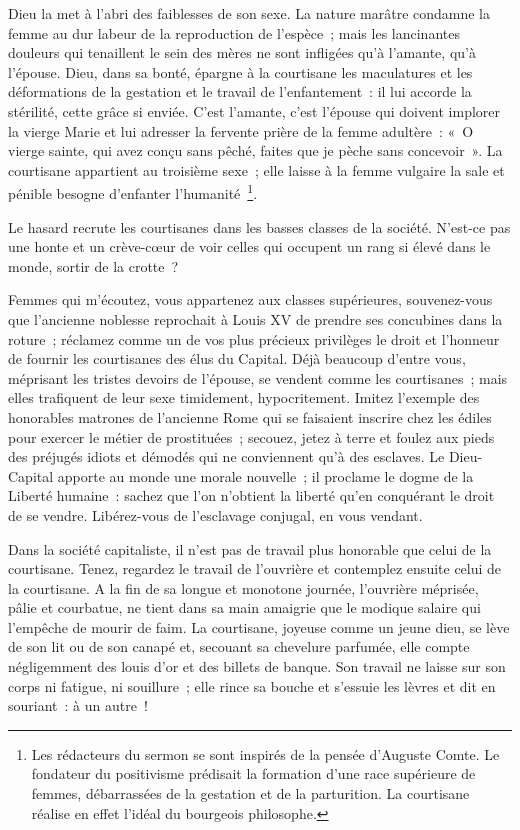 \documentclass[french,twoside]{book} %
\begin{document}
Dieu la met à l’abri des faiblesses de son sexe. La nature marâtre condamne la femme au dur labeur de la reproduction de l’espèce ; mais les lancinantes douleurs qui tenaillent le sein des mères ne sont infligées qu’à l’amante, qu’à l’épouse. Dieu, dans sa bonté, épargne à la courtisane les maculatures et les déformations de la gestation et le travail de l’enfantement : il lui accorde la stérilité, cette grâce si enviée. C'est l’amante, c’est l’épouse qui doivent implorer la vierge Marie et lui adresser la fervente prière de la femme adultère : « O vierge sainte, qui avez conçu sans pêché, faites que je pèche sans concevoir ». La courtisane appartient au troisième sexe ; elle laisse à la femme vulgaire la sale et pénible besogne d’enfanter l’humanité \footnote{Les rédacteurs du sermon se sont inspirés de la pensée d’Auguste Comte. Le fondateur du positivisme prédisait la formation d’une race supérieure de femmes, débarrassées de la gestation et de la parturition. La courtisane réalise en effet l’idéal du bourgeois philosophe.}.\par
Le hasard recrute les courtisanes dans les basses classes de la société. N'est-ce pas une honte et un crève-cœur de voir celles qui occupent un rang si élevé dans le monde, sortir de la crotte ?\par
Femmes qui m’écoutez, vous appartenez aux classes supérieures, souvenez-vous que l’ancienne noblesse reprochait à Louis XV de prendre ses concubines dans la roture ; réclamez comme un de vos plus précieux privilèges le droit et l’honneur de fournir les courtisanes des élus du Capital. Déjà beaucoup d’entre vous, méprisant les tristes devoirs de l’épouse, se vendent comme les courtisanes ; mais elles trafiquent de leur sexe timidement, hypocritement. Imitez l’exemple des honorables matrones de l’ancienne Rome qui se faisaient inscrire chez les édiles pour exercer le métier de prostituées ; secouez, jetez à terre et foulez aux pieds des préjugés idiots et démodés qui ne conviennent qu’à des esclaves. Le Dieu-Capital apporte au monde une morale nouvelle ; il proclame le dogme de la Liberté humaine : sachez que l’on n’obtient la liberté qu’en conquérant le droit de se vendre. Libérez-vous de l’esclavage conjugal, en vous vendant.\par
Dans la société capitaliste, il n’est pas de travail plus honorable que celui de la courtisane. Tenez, regardez le travail de l’ouvrière et contemplez ensuite celui de la courtisane. A la fin de sa longue et monotone journée, l’ouvrière méprisée, pâlie et courbatue, ne tient dans sa main amaigrie que le modique salaire qui l’empêche de mourir de faim. La courtisane, joyeuse comme un jeune dieu, se lève de son lit ou de son canapé et, secouant sa chevelure parfumée, elle compte négligemment des louis d’or et des billets de banque. Son travail ne laisse sur son corps ni fatigue, ni souillure ; elle rince sa bouche et s’essuie les lèvres et dit en souriant : à un autre !\par
\end{document}
